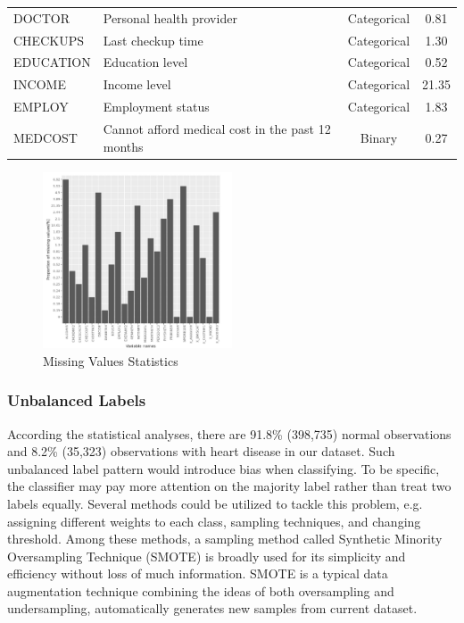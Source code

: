 \documentclass[11pt]{article}
\begin{document}
\begin{table}[hbt]
\begin{tabular}{llcc}
        DOCTOR & Personal health provider & Categorical & 0.81  \\ 
        CHECKUPS & Last checkup time & Categorical & 1.30  \\
        EDUCATION & Education level & Categorical & 0.52  \\ 
        INCOME & Income level & Categorical & 21.35  \\ 
        EMPLOY & Employment status & Categorical & 1.83  \\ 
        MEDCOST & Cannot afford medical cost in the past 12 months & Binary & 0.27  \\
        \hline
    \end{tabular}
\end{table}

\begin{figure}
\centering
\includegraphics[width=0.5\textwidth]{miss.jpg}
\caption{Missing Values Statistics}
\label{miss}
\end{figure}
 
\subsubsection{Unbalanced Labels}
According the statistical analyses, there are 91.8\% (398,735) normal observations and 8.2\% (35,323) observations with heart disease in our dataset. Such unbalanced label pattern would introduce bias when classifying. To be specific, the classifier may pay more attention on the majority label rather than treat two labels equally. Several methods could be utilized to tackle this problem, e.g. assigning different weights to each class, sampling techniques, and changing threshold. Among these methods, a sampling method called Synthetic Minority Oversampling Technique (SMOTE) is broadly used for its simplicity and efficiency without loss of much information. SMOTE is a typical data augmentation technique combining the ideas of both oversampling and undersampling, automatically generates new samples from current dataset. 
\end{document}
